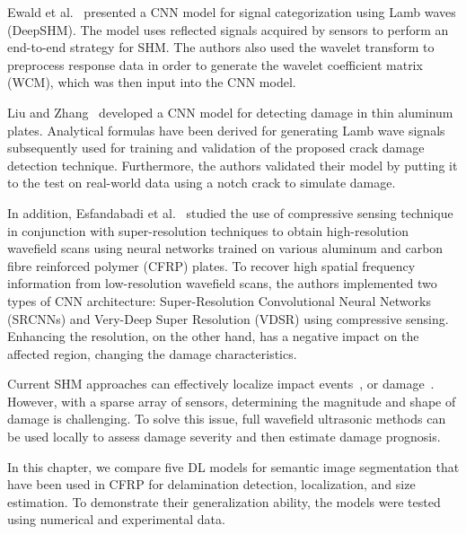 Ewald et al.~\cite{Ewald2019b} presented a CNN model for signal categorization using Lamb waves (DeepSHM).
The model uses reflected signals acquired by sensors to perform an end-to-end strategy for SHM.
The authors also used the wavelet transform to preprocess response data in order to generate the wavelet coefficient matrix (WCM), which was then input into the CNN model.

Liu and Zhang~\cite{Liu2020a} developed a CNN model for detecting damage in thin aluminum plates.
Analytical formulas have been derived for generating Lamb wave signals subsequently used for training and validation of the proposed crack damage detection technique.
Furthermore, the authors validated their model by putting it to the test on real-world data using a notch crack to simulate damage.

In addition, Esfandabadi et al.~\cite{esfandabadideep} studied the use of compressive sensing technique~\cite{Candes2006} in conjunction with super-resolution techniques to obtain high-resolution wavefield scans using neural networks trained on various aluminum and carbon fibre reinforced polymer (CFRP) plates.
To recover high spatial frequency information from low-resolution wavefield scans, the authors implemented two types of CNN architecture: Super-Resolution Convolutional Neural Networks (SRCNNs) and Very-Deep Super Resolution (VDSR) using compressive sensing.
Enhancing the resolution, on the other hand, has a negative impact on the affected region, changing the damage characteristics.

Current SHM approaches can effectively localize impact events~\cite{Ciampa2012}, or damage~\cite{Nokhbatolfoghahai2020}.
However, with a sparse array of sensors, determining the magnitude and shape of damage is challenging.
To solve this issue, full wavefield ultrasonic methods can be used locally to assess damage severity and then estimate damage prognosis.

In this chapter, we compare five DL models for semantic image segmentation that have been used in CFRP for delamination detection, localization, and size estimation.
To demonstrate their generalization ability, the models were tested using numerical and experimental data.
